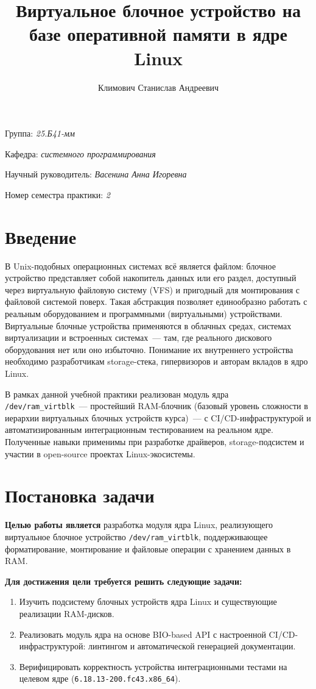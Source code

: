 \documentclass[a4paper]{article}
\title{Виртуальное блочное устройство на базе оперативной памяти в ядре Linux}
\author{Климович Станислав Андреевич}
\date{}
\begin{document}
\maketitle

\begin{flushright}
    Группа: \emph{25.Б41-мм}

    Кафедра: \emph{системного программирования}

    Научный руководитель: \emph{Васенина Анна Игоревна}

    Номер семестра практики: \emph{2}
\end{flushright}

\section{Введение}
В Unix-подобных операционных системах всё является файлом:
блочное устройство представляет собой накопитель данных или его раздел, доступный через виртуальную файловую систему (VFS) и пригодный
для монтирования с файловой системой поверх. Такая абстракция позволяет
единообразно работать с реальным оборудованием и программными (виртуальными)
устройствами. Виртуальные блочные устройства применяются в
облачных средах, системах виртуализации и встроенных системах~--- там, где
реального дискового оборудования нет или оно избыточно. Понимание их
внутреннего устройства необходимо разработчикам storage-стека, гипервизоров
и авторам вкладов в ядро Linux.

В рамках данной учебной практики реализован модуль ядра \texttt{/dev/ram\_virtblk}~---
простейший RAM-блочник (базовый уровень сложности в иерархии виртуальных
блочных устройств курса)~--- с CI/CD-инфраструктурой и автоматизированным
интеграционным тестированием на реальном ядре. Полученные навыки применимы
при разработке драйверов, storage-подсистем и участии в open-source проектах
Linux-экосистемы.

\section{Постановка задачи}
\textbf{Целью работы является} разработка модуля ядра Linux, реализующего
виртуальное блочное устройство \texttt{/dev/ram\_virtblk}, поддерживающее
форматирование, монтирование и файловые операции с хранением данных в RAM.

\textbf{Для достижения цели требуется решить следующие задачи:}
\begin{enumerate}
    \item Изучить подсистему блочных устройств ядра Linux и существующие
          реализации RAM-дисков.
    \item Реализовать модуль ядра на основе BIO-based API с настроенной
          CI/CD-инфраструктурой: линтингом и автоматической генерацией документации.
    \item Верифицировать корректность устройства интеграционными тестами
          на целевом ядре (\texttt{6.18.13-200.fc43.x86\_64}).
\end{enumerate}
\end{document}
